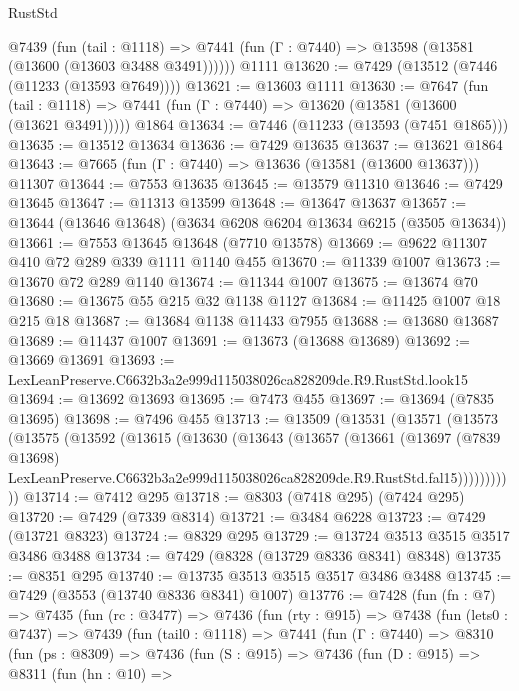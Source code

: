 \begin{lexlean}{RustStd}
\begin{coremodule}
    @7439
      (fun (tail : @1118) =>
      @7441 (fun (Γ : @7440) => @13598 (@13581 (@13600 (@13603 @3488 @3491))))))
    @1111
@13620 := @7429 (@13512 (@7446 (@11233 (@13593 @7649))))
@13621 := @13603 @1111
@13630 := @7647
    (fun (tail : @1118) => @7441 (fun (Γ : @7440) => @13620 (@13581 (@13600 (@13621 @3491)))))
    @1864
@13634 := @7446 (@11233 (@13593 (@7451 @1865)))
@13635 := @13512 @13634
@13636 := @7429 @13635
@13637 := @13621 @1864
@13643 := @7665 (fun (Γ : @7440) => @13636 (@13581 (@13600 @13637))) @11307
@13644 := @7553 @13635
@13645 := @13579 @11310
@13646 := @7429 @13645
@13647 := @11313 @13599
@13648 := @13647 @13637
@13657 := @13644 (@13646 @13648) (@3634 @6208 @6204 @13634 @6215 (@3505 @13634))
@13661 := @7553 @13645 @13648 (@7710 @13578)
@13669 := @9622 @11307 @410 @72 @289 @339 @1111 @1140 @455
@13670 := @11339 @1007
@13673 := @13670 @72 @289 @1140
@13674 := @11344 @1007
@13675 := @13674 @70
@13680 := @13675 @55 @215 @32 @1138 @1127
@13684 := @11425 @1007 @18 @215 @18
@13687 := @13684 @1138 @11433 @7955
@13688 := @13680 @13687
@13689 := @11437 @1007
@13691 := @13673 (@13688 @13689)
@13692 := @13669 @13691
@13693 := LexLeanPreserve.C6632b3a2e999d115038026ca828209de.R9.RustStd.look15
@13694 := @13692 @13693
@13695 := @7473 @455
@13697 := @13694 (@7835 @13695)
@13698 := @7496 @455
@13713 := @13509
    (@13531
      (@13571
        (@13573
          (@13575
            (@13592
              (@13615
                (@13630
                  (@13643
                    (@13657
                      (@13661
                        (@13697
                          (@7839 @13698)
                          LexLeanPreserve.C6632b3a2e999d115038026ca828209de.R9.RustStd.fal15)))))))))))
@13714 := @7412 @295
@13718 := @8303 (@7418 @295) (@7424 @295)
@13720 := @7429 (@7339 @8314)
@13721 := @3484 @6228
@13723 := @7429 (@13721 @8323)
@13724 := @8329 @295
@13729 := @13724 @3513 @3515 @3517 @3486 @3488
@13734 := @7429 (@8328 (@13729 @8336 @8341) @8348)
@13735 := @8351 @295
@13740 := @13735 @3513 @3515 @3517 @3486 @3488
@13745 := @7429 (@3553 (@13740 @8336 @8341) @1007)
@13776 := @7428
    (fun (fn : @7) =>
    @7435
      (fun (rc : @3477) =>
      @7436
        (fun (rty : @915) =>
        @7438
          (fun (lets0 : @7437) =>
          @7439
            (fun (tail0 : @1118) =>
            @7441
              (fun (Γ : @7440) =>
              @8310
                (fun (ps : @8309) =>
                @7436
                  (fun (S : @915) =>
                  @7436
                    (fun (D : @915) =>
                    @8311
                      (fun (hn : @10) =>

\end{coremodule}
\end{lexlean}
